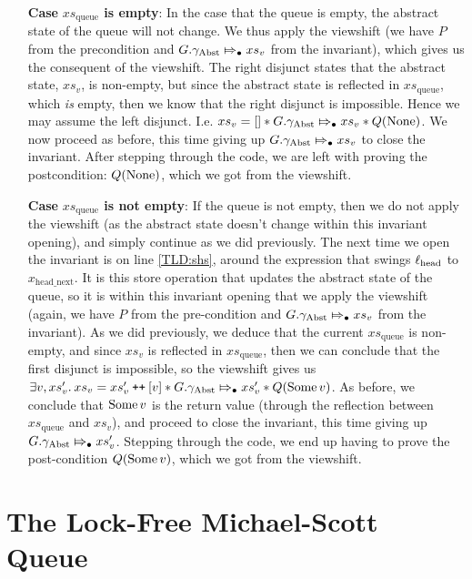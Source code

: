\documentclass[a4paper, 10pt]{report}
\theoremstyle{definition}
\newcommand{\xsqueue}{xs_{\mathrm{queue}}}
\newcommand{\locN}[1]{\loc_{\mathrm{#1}}}
\newcommand{\lochead}{\locN{head}}
\newcommand{\node}{x}
\newcommand{\nodeN}[1]{\node_{\mathrm{#1}}}
\newcommand{\nodeheadnext}{\nodeN{head\_next}}
\newcommand{\absvalue}{\val}
\newcommand{\absvalueList}{xs_v}
\newcommand{\Qg}{G}
\newcommand{\gabst}{\gname_{\mathrm{Abst}}}
\newcommand\catenate{\mathbin{\text{\ttfamily\upshape ++}}}
\newcommand{\abstractstateauth}[2]{#1 \Mapsto_{\bullet} #2}
\begin{document}
\begin{itemize}
  \item[\textbf{Case}] \textbf{$\xsqueue$ is empty}:
  In the case that the queue is empty, the abstract state of the queue will not change. We thus apply the viewshift (we have $P$ from the precondition and $\abstractstateauth{\Qg.\gabst}{\absvalueList}$ from the invariant), which gives us the consequent of the viewshift. The right disjunct states that the abstract state, $\absvalueList$, is non-empty, but since the abstract state is reflected in $\xsqueue$, which \emph{is} empty, then we know that the right disjunct is impossible. Hence we may assume the left disjunct. I.e. $\absvalueList = [] \star{} \abstractstateauth{\Qg.\gabst}{\absvalueList} \star{} Q(\None)$. We now proceed as before, this time giving up $\abstractstateauth{\Qg.\gabst}{\absvalueList}$ to close the invariant. After stepping through the code, we are left with proving the postcondition: $Q(\operatorname{None})$, which we got from the viewshift.

  \item[\textbf{Case}] \textbf{$\xsqueue$ is not empty}:
  If the queue is not empty, then we do not apply the viewshift (as the abstract state doesn't change within this invariant opening), and simply continue as we did previously. The next time we open the invariant is on line \ref{TLD:shs}, around the expression that swings $\lochead$ to $\nodeheadnext$. It is this store operation that updates the abstract state of the queue, so it is within this invariant opening that we apply the viewshift (again, we have $P$ from the pre-condition and $\abstractstateauth{\Qg.\gabst}{\absvalueList}$ from the invariant). As we did previously, we deduce that the current $\xsqueue$ is non-empty, and since $\absvalueList$ is reflected in $\xsqueue$, then we can conclude that the first disjunct is impossible, so the viewshift gives us $\Exists \absvalue, \absvalueList' . \absvalueList = \absvalueList' \catenate [\absvalue] \star{} \abstractstateauth{\Qg.\gabst}{\absvalueList'} \star{} Q(\Some{\absvalue})$. As before, we conclude that $\Some{\absvalue}$ is the return value (through the reflection between $\xsqueue$ and $\absvalueList$), and proceed to close the invariant, this time giving up $\abstractstateauth{\Qg.\gabst}{\absvalueList'}$. Stepping through the code, we end up having to prove the post-condition $Q(\Some{\absvalue})$, which we got from the viewshift.
\end{itemize}


\chapter{The Lock-Free Michael-Scott Queue}
\label{ch:LFMSQ}
\end{document}
